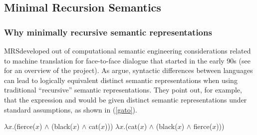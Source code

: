 \documentclass[output=paper
 	        ,biblatex
                ,babelshorthands
                ,newtxmath
                ,draftmode
                ,colorlinks, citecolor=brown
]{langscibook}
\begin{document}
\subsection{Minimal Recursion Semantics}
\label{sec-minimal-recursion-semantics}\label{semantics:sec-mrs}

\subsubsection{Why minimally recursive semantic representations}

MRS\indexmrsstart developed out of computational semantic engineering considerations related to machine translation for face-to-face dialogue that started in the early 90s (see \citealt{Kayetal1992} for an overview of the \verbmobil project). As \citet{Copestakeetal1995} argue, syntactic differences between languages can lead to logically equivalent distinct semantic representations when using traditional ``recursive'' semantic representations. They point out, for example, that the  expression  and   would be given distinct semantic representations under standard assumptions, as shown in (\ref{gato}).

\begin{exe}
\ex\label{gato}
\begin{xlist}
\ex\label{gatoa}
$\lambda x$.(fierce($x$) $\wedge$ (black($x$) $\wedge$ cat($x$)))
\ex\label{gatob}
$\lambda x$.(cat($x$) $\wedge$ (black($x$) $\wedge$ fierce($x$)))
\end{xlist}
\end{exe}
\end{document}
